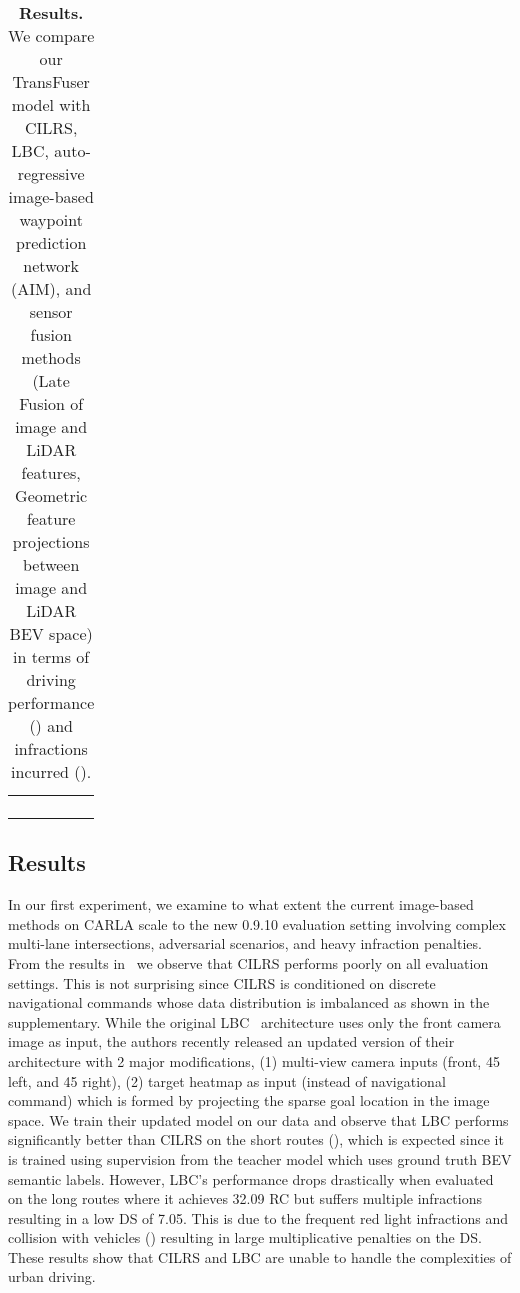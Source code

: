 \documentclass[final]{cvpr}
\newcommand{\boldparagraph}[1]{\vspace{0.1cm}\noindent{\bf #1:}}
\begin{document}
\begin{table*}[t]
\begin{tabular}{c c}
\begin{subtable}[h]{0.36\textwidth}
            \vspace{-0.2cm}
            \label{tab:infraction_analysis}
        \end{subtable}
    \end{tabular}
    \caption{\textbf{Results.} We compare our TransFuser model with CILRS, LBC, auto-regressive image-based waypoint prediction network (AIM), and sensor fusion methods (Late Fusion of image and LiDAR features, Geometric feature projections between image and LiDAR BEV space) in terms of driving performance () and infractions incurred ().}
    \label{tab:results}
    \vspace{-0.3cm}
\end{table*}

\subsection{Results}

\boldparagraph{Performance of CILRS and LBC} In our first experiment, we examine to what extent the current image-based methods on CARLA scale to the new 0.9.10 evaluation setting involving complex multi-lane intersections, adversarial scenarios, and heavy infraction penalties. From the results in~ we observe that CILRS performs poorly on all evaluation settings. This is not surprising since CILRS is conditioned on discrete navigational commands whose data distribution is imbalanced as shown in the supplementary. While the original LBC~\cite{Chen2019CORL} architecture uses only the front camera image as input, the authors recently released an updated version of their architecture with 2 major modifications, (1) multi-view camera inputs (front, 45 left, and 45 right), (2) target heatmap as input (instead of navigational command) which is formed by projecting the sparse goal location in the image space. We train their updated model on our data and observe that LBC performs significantly better than CILRS on the short routes (), which is expected since it is trained using supervision from the teacher model which uses ground truth BEV semantic labels. However, LBC's performance drops drastically when evaluated on the long routes where it achieves 32.09 RC but suffers multiple infractions resulting in a low DS of 7.05. This is due to the frequent red light infractions and collision with vehicles () resulting in large multiplicative penalties on the DS. These results show that CILRS and LBC are unable to handle the complexities of urban driving.
\end{document}
